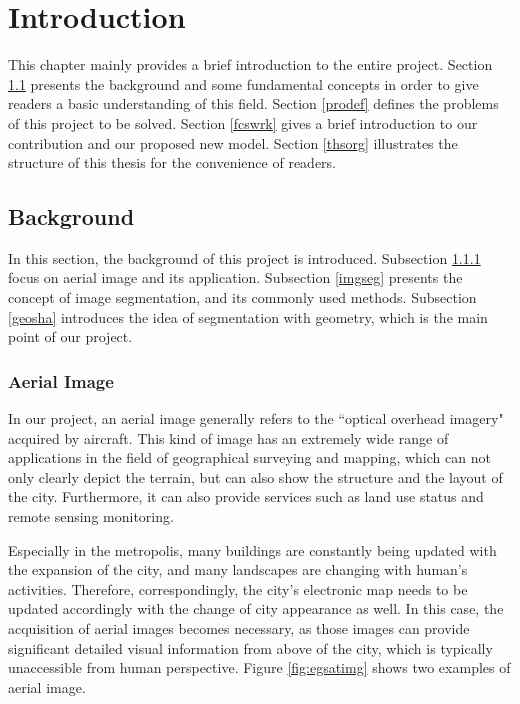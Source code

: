 \chapter{Introduction}

This chapter mainly provides a brief introduction to the entire project. Section \ref{bckgrd} presents the background and some fundamental concepts in order to give readers a basic understanding of this field. Section \ref{prodef} defines the problems of this project to be solved. Section \ref{fcswrk} gives a brief introduction to our contribution and our proposed new model. Section \ref{thsorg} illustrates the structure of this thesis for the convenience of readers.

\section{Background}\label{bckgrd}

In this section, the background of this project is introduced. Subsection \ref{arlimg} focus on aerial image and its application. Subsection \ref{imgseg} presents the concept of image segmentation, and its commonly used methods. Subsection \ref{geosha} introduces the idea of segmentation with geometry, which is  the main point of our project.

\subsection{Aerial Image}\label{arlimg}
In our project, an aerial image generally refers to the ``optical overhead imagery" \cite{mspascal} acquired by aircraft. This kind of image has an extremely wide range of applications in the field of geographical surveying and mapping, which can not only clearly depict the terrain, but can also show the structure and the layout of the city. Furthermore, it can also provide services such as land use status and remote sensing monitoring.

Especially in the metropolis, many buildings are constantly being updated with the expansion of the city, and many landscapes are changing with human's activities. Therefore, correspondingly, the city's electronic map needs to be updated accordingly with the change of city appearance as well. In this case, the acquisition of aerial images becomes necessary, as those images can provide significant detailed visual information from above of the city, which is typically unaccessible from human perspective. Figure \ref{fig:egsatimg} shows two examples of aerial image.

